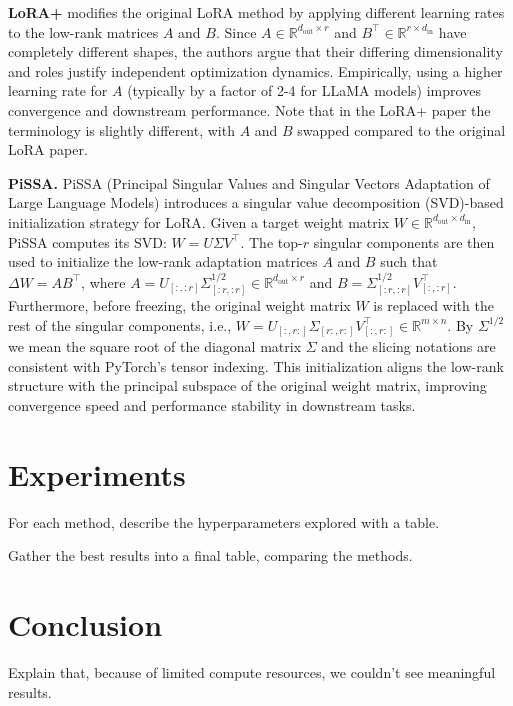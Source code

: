 \documentclass[a4paper,10pt,twocolumn,english]{article}
\begin{document}
\noindent\textbf{LoRA+}\cite{hayou2024loraefficientlowrank} modifies the original LoRA method by applying different learning rates to the low-rank matrices $A$ and $B$. Since $A\!\in\!\mathbb{R}^{d_{\text{out}}\times r}$ and $B^\top\!\in\!\mathbb{R}^{r\times d_{\text{in}}}$ have completely different shapes, the authors argue that their differing dimensionality and roles justify independent optimization dynamics. Empirically, using a higher learning rate for $A$ (typically by a factor of 2-4 for LLaMA models) improves convergence and downstream performance. Note that in the LoRA+ paper the terminology is slightly different, with $A$ and $B$ swapped compared to the original LoRA paper.

\noindent\textbf{PiSSA.} PiSSA\cite{meng2025pissaprincipalsingularvalues} (Principal Singular Values and Singular Vectors Adaptation of Large Language Models) introduces a singular value decomposition (SVD)-based initialization strategy for LoRA. Given a target weight matrix \( W \in \mathbb{R}^{d_{\text{out}} \times d_{\text{in}}} \), PiSSA computes its SVD: \( W = U \Sigma V^\top \). The top-\( r \) singular components are then used to initialize the low-rank adaptation matrices \( A \) and \( B \) such that \( \Delta W = AB^\top \), where \( A = U_{[:, :r]} \Sigma^{1 / 2}_{[:r, :r]} \in \mathbb{R}^{d_{\text{out}} \times r} \) and \( B = \Sigma^{1 / 2}_{[:r, :r]} V^\top_{[:, :r]} \). Furthermore, before freezing, the original weight matrix $W$ is replaced with the rest of the singular components, i.e., \( W = U_{[:, r:]} \Sigma_{[r:, r:]} V^\top_{[:, r:]} \in \mathbb{R}^{m \times n} \). By $\Sigma^{1 / 2}$ we mean the square root of the diagonal matrix $\Sigma$ and the slicing notations are consistent with PyTorch's tensor indexing. This initialization aligns the low-rank structure with the principal subspace of the original weight matrix, improving convergence speed and performance stability in downstream tasks.


\section{Experiments}
For each method, describe the hyperparameters explored with a table.

Gather the best results into a final table, comparing the methods.

\section{Conclusion}
Explain that, because of limited compute resources, we couldn't see meaningful results.



\end{document}
